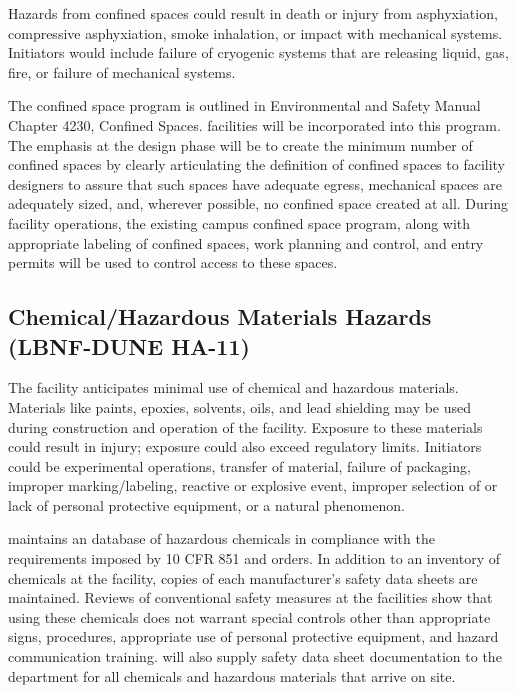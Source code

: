 Hazards from confined spaces could result in death or injury from
asphyxiation, compressive asphyxiation, smoke inhalation, or impact
with mechanical systems. Initiators would include failure of cryogenic
systems that are releasing liquid, gas, fire, or failure of mechanical
systems.

The \fnal confined space program is outlined in \fnal Environmental
and Safety Manual Chapter 4230, Confined
Spaces.  facilities will be incorporated into
this program. The emphasis at the  design
phase will be to create the minimum number of confined spaces by
clearly articulating the definition of confined spaces to facility
designers to assure that such spaces have adequate egress, mechanical
spaces are adequately sized, and, wherever possible, no confined space
created at all. During facility operations, the existing campus
confined space program, along with appropriate labeling of confined
spaces, work planning and control, and entry permits will be used to
control access to these spaces.

\subsection{Chemical/Hazardous Materials Hazards (LBNF-DUNE HA-11)}

The  facility anticipates minimal use of chemical and hazardous
materials. Materials like paints, epoxies, solvents, oils, and lead
shielding may be used during construction and operation of the
facility. Exposure to these materials could result in injury;
exposure could also exceed regulatory limits. Initiators could be
experimental operations, transfer of material, failure of packaging,
improper marking/labeling, reactive or explosive event, improper
selection of or lack of personal protective equipment, or a
natural phenomenon.

\fnal maintains an database of hazardous chemicals in compliance with
the requirements imposed by 10 CFR 851 and  orders. In
addition to an inventory of chemicals at the facility, copies of each
manufacturer's safety data sheets are maintained. Reviews of
conventional safety measures at the facilities show that using these
chemicals does not warrant special controls other than appropriate
signs, procedures, appropriate use of personal protective equipment,
and hazard communication training.  will also supply
safety data sheet documentation to the  
department for all chemicals and hazardous materials that arrive on
site.

